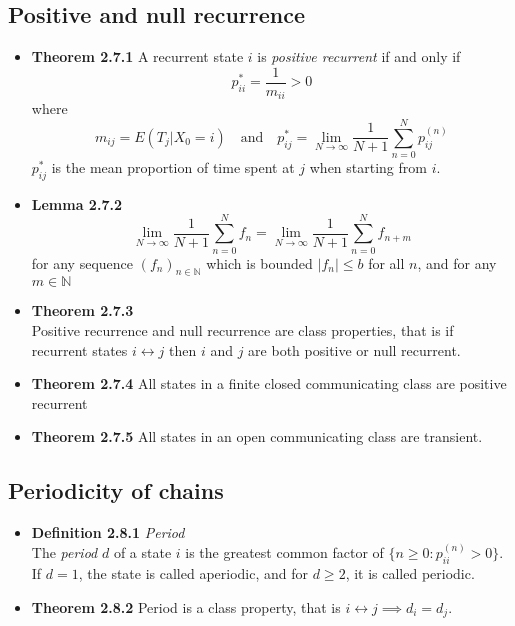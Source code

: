\documentclass[11pt,a4paper]{article}
\begin{document}
\subsection{Positive and null recurrence}
\begin{itemize}
	\item \textbf{Theorem 2.7.1} A recurrent state $i$ is \emph{positive recurrent} if and only if
		$$p_{ii}^* = \frac{1}{m_{ii}} > 0$$
		where 
		$$m_{ij} = E(T_j | X_0 = i) \quad \text{and} \quad p_{ij}^* = \lim_{N \to \infty} \frac{1}{N+1} \sum_{n=0}^N p_{ij}^{(n)}$$
		$p_{ij}^*$ is the mean proportion of time spent at $j$ when starting from $i$.

	\item \textbf{Lemma 2.7.2} \\
		$$\lim_{N \to \infty} \frac{1}{N+1} \sum_{n=0}^N f_n = \lim_{N\to \infty} \frac{1}{N+1} \sum_{n=0}^N f_{n+m} $$
		for any sequence $(f_n)_{n \in \mathbb{N}}$ which is bounded $|f_n| \leq b$ for all $n$, and for any $m \in \mathbb{N}$
	\item \textbf{Theorem 2.7.3} \\
		Positive recurrence and null recurrence are class properties, that is if recurrent states $i \leftrightarrow j$ then $i$ and $j$ are both positive or null recurrent.
	\item \textbf{Theorem 2.7.4} All states in a finite closed communicating class are positive recurrent
	\item \textbf{Theorem 2.7.5} All states in an open communicating class are transient.
\end{itemize}

\subsection{Periodicity of chains}
\begin{itemize}
	\item \textbf{Definition 2.8.1} \emph{Period} \\
		The \emph{period} $d$ of a state $i$ is the greatest common factor of
		$\{ n \geq 0 : p_{ii}^{(n)} > 0 \}$.
		If $d=1$, the state is called aperiodic, and for $d \geq 2$, it is called periodic.
	\item \textbf{Theorem 2.8.2} Period is a class property, that is $i \leftrightarrow j \implies d_i = d_j$.
\end{itemize}
\end{document}
